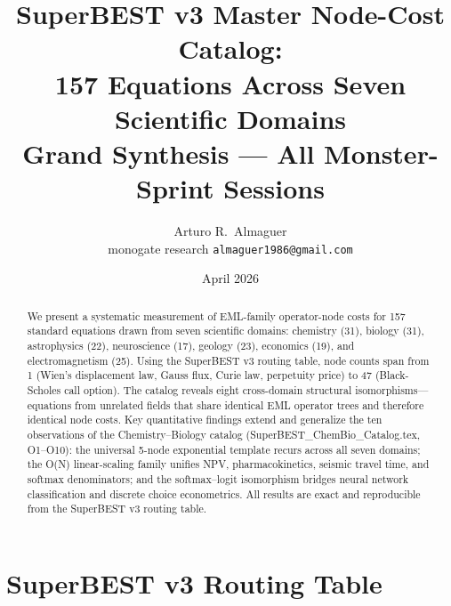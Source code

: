 \documentclass[12pt,a4paper]{article}
\title{SuperBEST v3 Master Node-Cost Catalog:\\
       157 Equations Across Seven Scientific Domains\\[6pt]
       \large Grand Synthesis --- All Monster-Sprint Sessions}
\author{Arturo R.\ Almaguer\\
\small monogate research \quad \texttt{almaguer1986@gmail.com}}
\date{April 2026}
\theoremstyle{definition}
\begin{document}
\maketitle

\begin{abstract}
We present a systematic measurement of EML-family operator-node costs for
157 standard equations drawn from seven scientific domains: chemistry (31),
biology (31), astrophysics (22), neuroscience (17), geology (23),
economics (19), and electromagnetism (25).
Using the SuperBEST v3 routing table, node counts span from 1 (Wien's
displacement law, Gauss flux, Curie law, perpetuity price) to 47
(Black-Scholes call option).
The catalog reveals eight cross-domain structural isomorphisms---equations
from unrelated fields that share identical EML operator trees and therefore
identical node costs.
Key quantitative findings extend and generalize the ten observations of the
Chemistry--Biology catalog (SuperBEST\_ChemBio\_Catalog.tex, O1--O10):
the universal 5-node exponential template recurs across all seven domains;
the O(N) linear-scaling family unifies NPV, pharmacokinetics,
seismic travel time, and softmax denominators; and the softmax--logit
isomorphism bridges neural network classification and discrete choice
econometrics.
All results are exact and reproducible from the SuperBEST v3 routing table.
\end{abstract}

\tableofcontents
\newpage

\section{SuperBEST v3 Routing Table}
\label{sec:routing}
\end{document}

